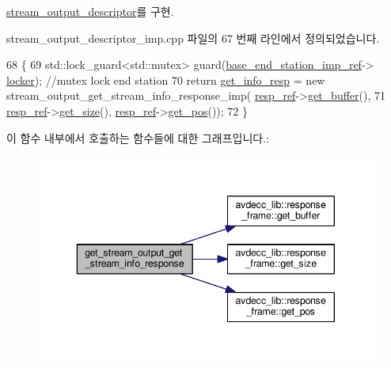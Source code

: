 \hyperlink{classavdecc__lib_1_1stream__output__descriptor_a7fec6aaa05428f91d87c020e6fb44d22}{stream\+\_\+output\+\_\+descriptor}를 구현.



stream\+\_\+output\+\_\+descriptor\+\_\+imp.\+cpp 파일의 67 번째 라인에서 정의되었습니다.


\begin{DoxyCode}
68 \{
69     std::lock\_guard<std::mutex> guard(\hyperlink{classavdecc__lib_1_1descriptor__base__imp_a550c969411f5f3b69f55cc139763d224}{base\_end\_station\_imp\_ref}->
      \hyperlink{classavdecc__lib_1_1end__station__imp_a2207f93fef130266b292686bf96ef8d3}{locker}); \textcolor{comment}{//mutex lock end station}
70     \textcolor{keywordflow}{return} \hyperlink{classavdecc__lib_1_1stream__output__descriptor__imp_a244eccf322cb5342cbe531e99fb54842}{get\_info\_resp} = \textcolor{keyword}{new} stream\_output\_get\_stream\_info\_response\_imp(
      \hyperlink{classavdecc__lib_1_1descriptor__base__imp_a2642e3a7c10d38553e7ff4a55e875346}{resp\_ref}->\hyperlink{classavdecc__lib_1_1response__frame_ad4680d622c198b5256c03b2eb2638c22}{get\_buffer}(),
71                                                                           
      \hyperlink{classavdecc__lib_1_1descriptor__base__imp_a2642e3a7c10d38553e7ff4a55e875346}{resp\_ref}->\hyperlink{classavdecc__lib_1_1response__frame_adf55ed6a1edf8e1aa4f3f5f97936ad1e}{get\_size}(), \hyperlink{classavdecc__lib_1_1descriptor__base__imp_a2642e3a7c10d38553e7ff4a55e875346}{resp\_ref}->\hyperlink{classavdecc__lib_1_1response__frame_a4038092b7b420000faefc768241adb42}{get\_pos}());
72 \}
\end{DoxyCode}


이 함수 내부에서 호출하는 함수들에 대한 그래프입니다.\+:
\nopagebreak
\begin{figure}[H]
\begin{center}
\leavevmode
\includegraphics[width=343pt]{classavdecc__lib_1_1stream__output__descriptor__imp_a61dee43eccecf7b2294b26b72b2a74c6_cgraph}
\end{center}
\end{figure}


